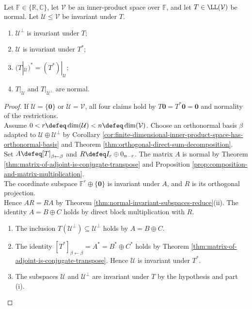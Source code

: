 \begin{corollary} \label{cor:normal-operator-invariant-subspaces-reduce} \\
Let $\mathbb{F}\in\{\mathbb{R},\mathbb{C}\}$, let $\mathcal{V}$ be an inner-product space over $\mathbb{F}$, and let $T\in\LL(\mathcal{V})$ be normal. Let $\mathcal{U}\leq\mathcal{V}$ be invariant under $T$.
\begin{enumerate}[label=(\roman*)]
\setlength{\itemsep}{0pt}
\item $\mathcal{U}^{\perp}$ is invariant under $T$;
\item $\mathcal{U}$ is invariant under $T^*$;
\item $(T|_{\mathcal{U}})^*=(T^*)|_{\mathcal{U}}$;
\item $T|_{\mathcal{U}}$ and $T|_{\mathcal{U}^{\perp}}$ are normal.
\end{enumerate}
\begin{proof}
If $\mathcal{U}=\{\mathbf{0}\}$ or $\mathcal{U}=\mathcal{V}$, all four claims hold by $T\mathbf{0}=T^*\mathbf{0}=\mathbf{0}$ and normality of the restrictions.\\
Assume $0<r\defeq\dim(\mathcal{U})<n\defeq\dim(\mathcal{V})$. Choose an orthonormal basis $\beta$ adapted to $\mathcal{U}\oplus\mathcal{U}^{\perp}$ by Corollary \ref{cor:finite-dimensional-inner-product-space-has-orthonormal-basis} and Theorem \ref{thm:orthogonal-direct-sum-decomposition}.\\
Set $A\defeq[T]_{\beta\leftarrow\beta}$ and $R\defeq I_r\oplus0_{n-r}$. The matrix $A$ is normal by Theorem \ref{thm:matrix-of-adjoint-is-conjugate-transpose} and Proposition \ref{prop:composition-and-matrix-multiplication}.\\
The coordinate subspace $\mathbb{F}^r\oplus\{\mathbf{0}\}$ is invariant under $A$, and $R$ is its orthogonal projection.\\
Hence $AR=RA$ by Theorem \ref{thm:normal-invariant-subspaces-reduce}(ii). The identity $A=B\oplus C$ holds by direct block multiplication with $R$.
\begin{enumerate}[label=(\roman*)]
\setlength{\itemsep}{0pt}
\item The inclusion $T(\mathcal{U}^{\perp})\subseteq\mathcal{U}^{\perp}$ holds by $A=B\oplus C$.
\item The identity $[T^*]_{\beta\leftarrow\beta}=A^*=B^*\oplus C^*$ holds by Theorem \ref{thm:matrix-of-adjoint-is-conjugate-transpose}. Hence $\mathcal{U}$ is invariant under $T^*$.
\item The subspaces $\mathcal{U}$ and $\mathcal{U}^{\perp}$ are invariant under $T$ by the hypothesis and part (i).\\

\end{enumerate}
\end{proof}
\end{corollary}
